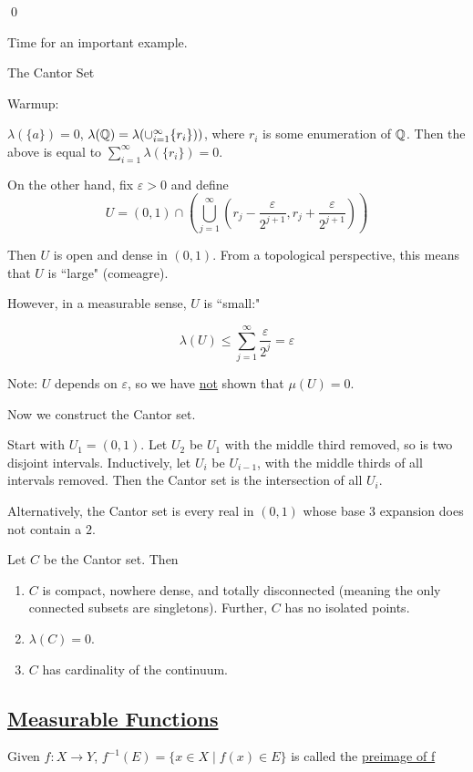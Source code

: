 \documentclass[x11names,reqno,14pt]{extarticle}
\newcommand*{\oo}{\infty}
\newcommand{\seq}[1]{_{#1 = 1}^\oo}
\begin{document}
\qed

Time for an important example. 

\exm The Cantor Set

Warmup: 

$\lambda(\{a\}) = 0$, $\lambda(\Q) = \lambda(\cup\seq{i}\{r_i\}))$, where $r_i$ is some enumeration of $\mathbb{Q}$. Then the above is equal to $\sum\seq{i}\lambda(\{r_i\}) = 0$. 

On the other hand, fix $\varepsilon>0$ and define 
\[
U = (0, 1) \cap \left(\bigcup\seq{j}(r_j - \frac{\varepsilon}{2^{j + 1}}, r_j + \frac{\varepsilon}{2^{j + 1}})\right)
\]

Then $U$ is open and dense in $(0, 1)$. From a topological perspective, this means that $U$ is ``large" (comeagre). 

However, in a measurable sense, $U$ is ``small:" 

\[
\lambda(U) \leq \sum\seq{j}\frac{\varepsilon}{2^j} = \varepsilon
\]

Note: $U$ depends on $\varepsilon$, so we have \underline{not} shown that $\mu(U) = 0$. 

Now we construct the Cantor set. 

Start with $U_1 = (0, 1)$. Let $U_2$ be $U_1$ with the middle third removed, so is two disjoint intervals. Inductively, let $U_i$ be $U_{i - 1}$, with the middle thirds of all intervals removed. Then the Cantor set is the intersection of all $U_i$. 

Alternatively, the Cantor set is every real in $(0, 1)$ whose base 3 expansion does not contain a $2$. 

\thm 

Let $C$ be the Cantor set. Then

\begin{enumerate}[label=(\roman*)]
\item $C$ is compact, nowhere dense, and totally disconnected (meaning the only connected subsets are singletons). Further, $C$ has no isolated points. 
\item $\lambda(C) = 0$. 
\item $C$ has cardinality of the continuum. 
\end{enumerate}

\subsection*{\underline{Measurable Functions}}


Given $f:X\to Y$, $f^{-1}(E) = \{x \in X \mid f(x) \in E\}$ is called the \underline{preimage of f}
\end{document}
